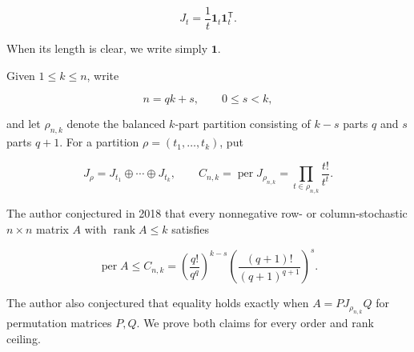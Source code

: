 \documentclass[11pt]{article}
\theoremstyle{remark}
\begin{document}
\[
 J_t=\frac1t\mathbf1_t\mathbf1_t^{\mathsf T}.
\]

When its length is clear, we write simply \(\mathbf1\).

Given \(1\leq k\leq n\), write

\[
 n=qk+s,\qquad 0\leq s<k,                                  \tag{1.2}
\]

and let \(\rho_{n,k}\) denote the balanced \(k\)-part partition consisting
of \(k-s\) parts \(q\) and \(s\) parts \(q+1\). For a partition
\(\rho=(t_1,\ldots,t_k)\), put

\[
 J_\rho=J_{t_1}\oplus\cdots\oplus J_{t_k},
 \qquad
 C_{n,k}=\operatorname{per}J_{\rho_{n,k}}
 =\prod_{t\in\rho_{n,k}}\frac{t!}{t^t}.                    \tag{1.3}
\]

The author conjectured in 2018 \cite{lavi2018} that every nonnegative row- or
column-stochastic \(n\times n\) matrix \(A\) with
\(\operatorname{rank}A\leq k\) satisfies

\[
 \operatorname{per}A\leq C_{n,k}
 =\left(\frac{q!}{q^q}\right)^{k-s}
  \left(\frac{(q+1)!}{(q+1)^{q+1}}\right)^s.              \tag{1.4}
\]

The author also conjectured that equality holds exactly when
\(A=PJ_{\rho_{n,k}}Q\) for permutation matrices \(P,Q\). We prove both
claims for every order and rank ceiling.
\end{document}
